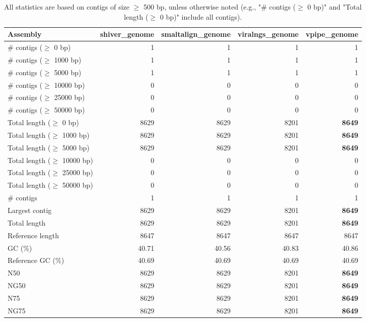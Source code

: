 \documentclass[12pt,a4paper]{article}
\begin{document}
\begin{table}[ht]
\begin{center}
\caption{All statistics are based on contigs of size $\geq$ 500 bp, unless otherwise noted (e.g., "\# contigs ($\geq$ 0 bp)" and "Total length ($\geq$ 0 bp)" include all contigs).}
\begin{tabular}{|l*{4}{|r}|}
\hline
Assembly & shiver\_genome & smaltalign\_genome & viralngs\_genome & vpipe\_genome \\ \hline
\# contigs ($\geq$ 0 bp) & 1 & 1 & 1 & 1 \\ \hline
\# contigs ($\geq$ 1000 bp) & 1 & 1 & 1 & 1 \\ \hline
\# contigs ($\geq$ 5000 bp) & 1 & 1 & 1 & 1 \\ \hline
\# contigs ($\geq$ 10000 bp) & 0 & 0 & 0 & 0 \\ \hline
\# contigs ($\geq$ 25000 bp) & 0 & 0 & 0 & 0 \\ \hline
\# contigs ($\geq$ 50000 bp) & 0 & 0 & 0 & 0 \\ \hline
Total length ($\geq$ 0 bp) & 8629 & 8629 & 8201 & {\bf 8649} \\ \hline
Total length ($\geq$ 1000 bp) & 8629 & 8629 & 8201 & {\bf 8649} \\ \hline
Total length ($\geq$ 5000 bp) & 8629 & 8629 & 8201 & {\bf 8649} \\ \hline
Total length ($\geq$ 10000 bp) & 0 & 0 & 0 & 0 \\ \hline
Total length ($\geq$ 25000 bp) & 0 & 0 & 0 & 0 \\ \hline
Total length ($\geq$ 50000 bp) & 0 & 0 & 0 & 0 \\ \hline
\# contigs & 1 & 1 & 1 & 1 \\ \hline
Largest contig & 8629 & 8629 & 8201 & {\bf 8649} \\ \hline
Total length & 8629 & 8629 & 8201 & {\bf 8649} \\ \hline
Reference length & 8647 & 8647 & 8647 & 8647 \\ \hline
GC (\%) & 40.71 & 40.56 & 40.83 & 40.86 \\ \hline
Reference GC (\%) & 40.69 & 40.69 & 40.69 & 40.69 \\ \hline
N50 & 8629 & 8629 & 8201 & {\bf 8649} \\ \hline
NG50 & 8629 & 8629 & 8201 & {\bf 8649} \\ \hline
N75 & 8629 & 8629 & 8201 & {\bf 8649} \\ \hline
NG75 & 8629 & 8629 & 8201 & {\bf 8649} \\ \hline

\end{tabular}
\end{center}
\end{table}
\end{document}
